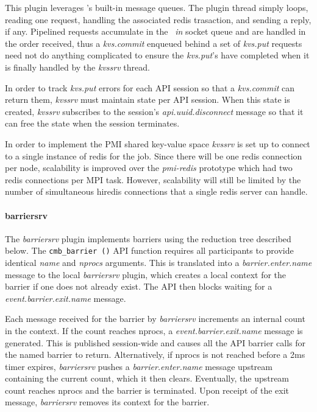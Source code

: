 This plugin leverages \zMQ's built-in message queues.  The plugin thread
simply loops, reading one request, handling the associated redis trasaction,
and sending a reply, if any.  Pipelined requests accumulate in the \zMQ\ 
{\em in} socket queue and are handled in the order received, thus a
{\em kvs.commit} enqueued behind a set of {\em kvs.put} requests need
not do anything complicated to ensure the {\em kvs.put}'s have completed 
when it is finally handled by the {\em kvssrv} thread.

In order to track {\em kvs.put} errors for each API session so that a
{\em kvs.commit} can return them, {\em kvssrv} must maintain state per
API session.  When this state is created, {\em kvssrv} subscribes to
the session's {\em api.uuid.disconnect} message so that it can free
the state when the session terminates.

In order to implement the PMI shared key-value space {\em kvssrv}
is set up to connect to a single instance of redis for the job.
Since there will be one redis connection per node, scalability is improved
over the {\em pmi-redis} prototype which had two redis connections per
MPI task.  However, scalability will still be limited by the number
of simultaneous hiredis connections that a single redis server can handle.

\paragraph{barriersrv}
The {\em barriersrv} plugin implements barriers using the reduction
tree described below.   The {\tt cmb\_barrier ()} API function requires
all participants to provide identical {\em name} and {\em nprocs} arguments.
This is translated into a {\em barrier.enter.name} message to the local
{\em barriersrv} plugin, which creates a local context for the barrier
if one does not already exist.  The API then blocks waiting for a
{\em event.barrier.exit.name} message.

Each message received for the barrier by {\em barriersrv} increments
an internal count in the context.  If the count reaches nprocs,
a {\em event.barrier.exit.name} message is generated.  This is published
session-wide and causes all the API barrier calls for the named barrier
to return.  Alternatively, if nprocs is not reached before a 2ms timer
expires, {\em barriersrv} pushes a {\em barrier.enter.name} message upstream
containing the current count, which it then clears.  Eventually, the upstream
count reaches nprocs and the barrier is terminated.  Upon receipt of the
exit message, {\em barriersrv} removes its context for the barrier.

